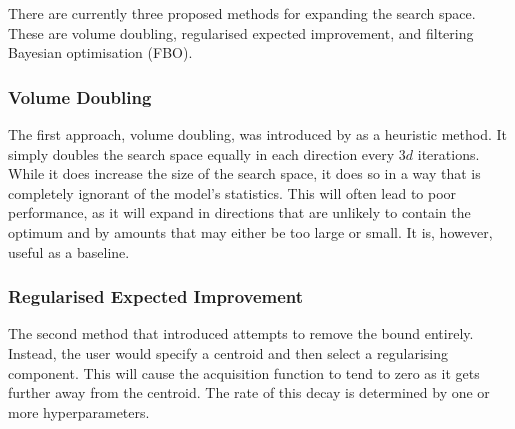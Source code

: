 \documentclass[preprint]{elsarticle}
\begin{document}
There are currently three proposed methods for expanding the search space. These are volume doubling, regularised expected improvement, and filtering Bayesian optimisation (FBO).

\subsubsection{Volume Doubling}
The first approach, volume doubling, was introduced by \cite{shahriari2016unbounded} as a heuristic method. It simply doubles the search space equally in each direction every $3d$ iterations. %
While it does increase the size of the search space, it does so in a way that is completely ignorant of the model's statistics. This will often lead to poor performance, as it will expand in directions that are unlikely to contain the optimum and by amounts that may either be too large or small. It is, however, useful as a baseline.

\subsubsection{Regularised Expected Improvement}
The second method that \cite{shahriari2016unbounded} introduced attempts to remove the bound entirely. Instead, the user would specify a centroid and then select a regularising component. This will cause the acquisition function to tend to zero as it gets further away from the centroid. The rate of this decay is determined by one or more hyperparameters.
\end{document}
